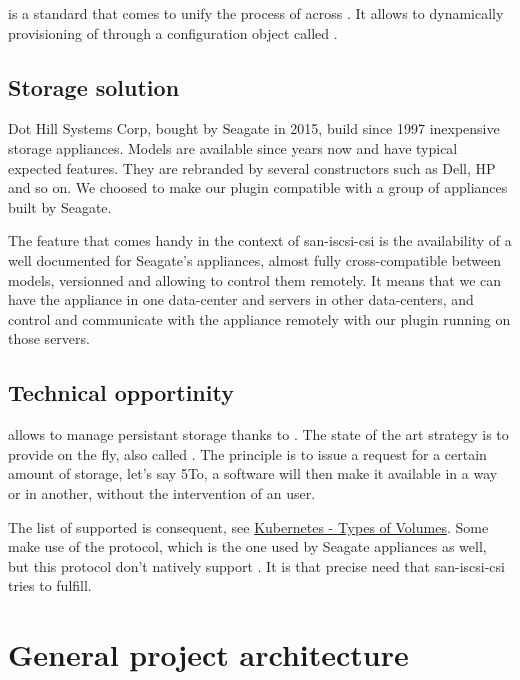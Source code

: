  is a standard that comes to unify the process of  across . It allows to dynamically provisioning of  through a configuration object called .

\subsection{Storage solution}

Dot Hill Systems Corp, bought by Seagate in 2015, build since 1997 inexpensive storage appliances. Models are available since years now and have typical expected features. They are rebranded by several constructors such as Dell, HP and so on. We choosed to make our  plugin compatible with a group of appliances built by Seagate.

The feature that comes handy in the context of \gls{san-iscsi-csi} is the availability of a well documented  for Seagate's appliances, almost fully cross-compatible between models, versionned and allowing to control them remotely. It means that we can have the appliance in one data-center and servers in other data-centers, and control and communicate with the appliance remotely with our plugin running on those servers.

\subsection{Technical opportinity}

 allows to manage  persistant storage thanks to . The state of the art strategy is to provide  on the fly, also called . The principle is to issue a request for a certain amount of storage, let's say 5To, a software will then make it available in a way or in another, without the intervention of an user.

The list of supported  is consequent, see \href{https://kubernetes.io/docs/concepts/storage/volumes/\#types-of-volumes}{Kubernetes - Types of Volumes}. Some  make use of the  protocol, which is the one used by Seagate appliances as well, but this protocol don't natively support . It is that precise need that \gls{san-iscsi-csi} tries to fulfill.

\section{General project architecture}

